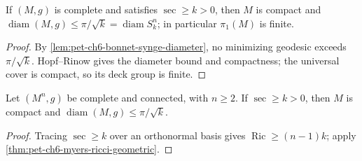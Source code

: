 \begin{corollary}
  \label{cor:pet-ch6-hopf-rinow-myers-diameter}



  If $(M,g)$ is complete and satisfies $\sec\ge k>0$, then $M$ is compact and
  $\operatorname{diam}(M,g)\le\pi/\sqrt k=\operatorname{diam}S^n_k$; in particular $\pi_1(M)$ is
  finite.
\end{corollary}
\begin{proof}
  \sketch
  By \cref{lem:pet-ch6-bonnet-synge-diameter}, no minimizing geodesic exceeds \(\pi/\sqrt{k}\). Hopf--Rinow gives the diameter bound and compactness; the universal cover is compact, so its deck group is finite.
\end{proof}

\begin{corollary}
  \label{cor:pet-ch6-hopf-rinow-myers-geometric}


  Let $(M^n,g)$ be complete and connected, with $n\ge2$. If
  $\sec\ge k>0$, then $M$ is compact and
  $\operatorname{diam}(M,g)\le\pi/\sqrt k$.
\end{corollary}
\begin{proof}

  \sketch
  Tracing \(\sec\ge k\) over an orthonormal basis gives \(\operatorname{Ric}\ge(n-1)k\); apply \cref{thm:pet-ch6-myers-ricci-geometric}.
\end{proof}

